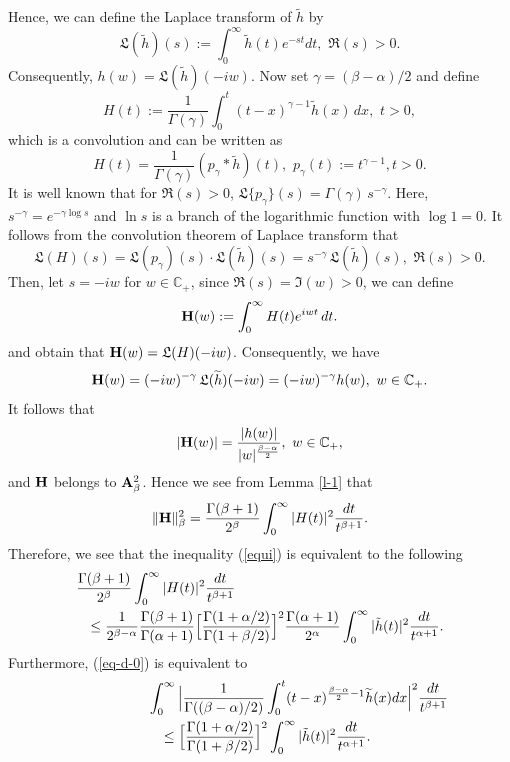 \documentclass[10pt]{amsart}
\theoremstyle{definition}    %
\numberwithin{equation}{section}
\begin{document}
Hence, we can define the Laplace transform of $\widetilde{h}$ by
$$\mathfrak{L}(\widetilde{h})(s):=\int_{0}^{\infty}\widetilde{h}(t)e^{-st}dt,\,\, \Re(s)>0.$$
Consequently, $h(w)=\mathfrak{L}(\widetilde{h})(-iw).$ Now set $\gamma=(\beta-\alpha)/2$ and define
$$
H(t) := \frac{1}{\Gamma(\gamma)} \int_0^t (t-x)^{\gamma-1} \widetilde{h}(x) \, dx,\,\, t>0,
$$
which is a convolution and can be written as  
$$
H(t) =\frac{1}{\Gamma(\gamma)}  (p_{\gamma} *\widetilde{h})(t),\,\, p_{\gamma}(t) := {t}^{\gamma-1}, t>0.
$$
It is well known that for $\Re(s) > 0$, $
\mathfrak{L}\{p_{\gamma}\}(s)=\Gamma(\gamma)\,s^{-\gamma}.$ Here, $s^{-\gamma} = e^{-\gamma\log s}$ and $\ln s$ is a branch of the logarithmic function with $\log 1=0$. 
It follows from the convolution theorem of Laplace transform that
 $$
\mathfrak{L}(H)(s) = \mathfrak{L}(p_{\gamma})(s) \cdot \mathfrak{L}(\widetilde{h})(s)
            = s^{-\gamma} \, \mathfrak{L}(\widetilde{h})(s),\,\,\Re(s)>0.
$$
Then, let $s = -i w$ for $w \in \mathbb{C}_{+}$, since $\Re(s)= \Im(w) > 0$, we can define $$
{\bf{H}}(w) := \int_0^\infty H(t) e^{i w t} \, dt.          
$$ and obtain that ${\bf{H}}(w)=\mathfrak{L}(H)(-i w)$. 
Consequently, we have
$$
{\bf H}(w) =(-i w)^{-\gamma} \, \mathfrak{L}(\widetilde{h})(-i w)=(-i w)^{-\gamma} h(w), \,\,w \in \mathbb{C}_{+}.
$$
It follows that $$|{\bf H}(w)| =\frac{|h(w)|}{|w|^{\frac{\beta-\alpha}{2}}}, \,\, w \in \mathbb{C}_{+},$$
and $\bf H$ belongs to ${\bf A}_{\beta}^2$. Hence we see from Lemma \ref{l-1} that
$$
\|{\bf H}\|_{\beta}^{2} = \frac{\Gamma(\beta+1)}{2^{\beta}} \int_{0}^{\infty} |H(t)|^{2} \frac{dt}{t^{\beta+1}}.
$$
Therefore, we see that the inequality (\ref{equi}) is equivalent to the following
\begin{eqnarray}
\lefteqn{\frac{\Gamma(\beta+1)}{2^{\beta}} \int_{0}^{\infty} |H(t)|^{2} \frac{dt}{t^{\beta+1}}}\nonumber \\&&\leq \frac{1}{2^{\beta-\alpha}} \frac{\Gamma(\beta+1)}{\Gamma(\alpha+1)}\Big[\frac{\Gamma(1+\alpha/2)}{\Gamma(1+\beta/2)}\Big]^2 \frac{\Gamma(\alpha+1)}{2^{\alpha}} \int_{0}^{\infty} |\tilde{h}(t)|^{2} \frac{dt}{t^{\alpha+1}}.\nonumber
\end{eqnarray}
Furthermore, (\ref{eq-d-0}) is equivalent to 
\begin{eqnarray}\label{equi-1}
\lefteqn{\int_{0}^{\infty} \Big|\frac{1}{\Gamma((\beta-\alpha)/2)} \int_0^t (t-x)^{\frac{\beta-\alpha}{2}-1} \widetilde{h}(x)dx\Big|^{2} \frac{dt}{t^{\beta+1}}}\nonumber \\&&\leq \Big[\frac{\Gamma(1+\alpha/2)}{\Gamma(1+\beta/2)}\Big]^2 \int_{0}^{\infty} |\tilde{h}(t)|^{2} \frac{dt}{t^{\alpha+1}}.
\end{eqnarray}
\end{document}
